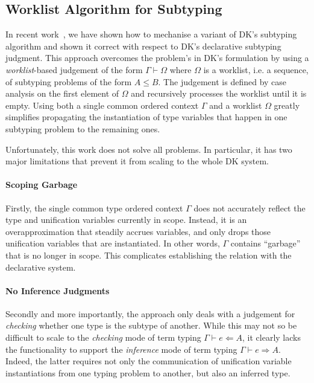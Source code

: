 \subsection{Worklist Algorithm for Subtyping}

In recent work~\cite{itp2018}, we have shown how to mechanise a variant of DK's
subtyping algorithm and shown it correct with respect to DK's declarative
subtyping judgment. This approach overcomes the problem's in DK's formulation
by using a \emph{worklist}-based judgement of the form $\Gamma \vdash \Omega$
where $\Omega$ is a worklist, i.e. a sequence, of subtyping problems of the
form $A \leq B$.  The judgement is defined by case analysis on the first
element of $\Omega$ and recursively processes the worklist until it is empty.
Using both a single common ordered context $\Gamma$ and a worklist $\Omega$ greatly
simplifies propagating the instantiation of type variables that happen in one
subtyping problem to the remaining ones.

Unfortunately, this work does not solve all problems. In particular, it has two
major limitations that prevent it from scaling to the whole DK system. 

\paragraph{Scoping Garbage} Firstly, the single common type ordered context 
$\Gamma$ does not accurately reflect the type and unification variables
currently in scope. Instead, it is an overapproximation that steadily accrues
variables, and only drops those unification variables that are instantiated.
In other words, $\Gamma$ contains ``garbage'' that is no longer in scope.
This complicates establishing the relation with the declarative system.


\paragraph{No Inference Judgments} 
Secondly and more importantly, the approach only deals with a judgement for
\emph{checking} whether one type is the subtype of another. While this may not
so be difficult to scale to the \emph{checking} mode of term typing $\Gamma
\vdash e \Leftarrow A$, it clearly lacks the functionality to support the
\emph{inference} mode of term typing $\Gamma \vdash e \Rightarrow A$. Indeed,
the latter requires not only the communication of unification variable
instantiations from one typing problem to another, but also an inferred type.

